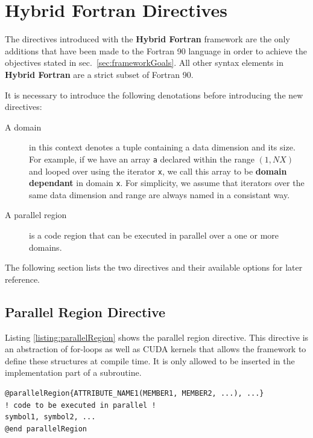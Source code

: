 \clearpage
\section{Hybrid Fortran Directives} \label{sec:archDirectives}

The directives introduced with the \textbf{Hybrid Fortran} framework are the only additions that have been made to the Fortran 90 language in order to achieve the objectives stated in sec.~\ref{sec:frameworkGoals}. All other syntax elements in \textbf{Hybrid Fortran} are a strict subset of Fortran 90.

It is necessary to introduce the following denotations before introducing the new directives:

\begin{description}
 \item [A domain] in this context denotes a tuple containing a data dimension and its size. For example, if we have an array \verb|a| declared within the range $(1,\unit{NX})$ and looped over using the iterator \verb|x|, we call this array to be \textbf{domain dependant} in domain \verb|x|. For simplicity, we assume that iterators over the same data dimension and range are always named in a consistant way.
 \item [A parallel region] is a code region that can be executed in parallel over a one or more domains.
\end{description}

The following section lists the two directives and their available options for later reference.

\subsection{Parallel Region Directive} \label{sub:parallelRegionDirective}

Listing \ref{listing:parallelRegion} shows the parallel region directive. This directive is an abstraction of for-loops as well as CUDA kernels that allows the framework to define these structures at compile time. It is only allowed to be inserted in the implementation part of a subroutine.

\begin{lstlisting}[name=parallelRegion, label=listing:parallelRegion, caption={Parallel region directive syntax.}]
@parallelRegion{ATTRIBUTE_NAME1(MEMBER1, MEMBER2, ...), ...}
! code to be executed in parallel !
symbol1, symbol2, ...
@end parallelRegion
\end{lstlisting}

